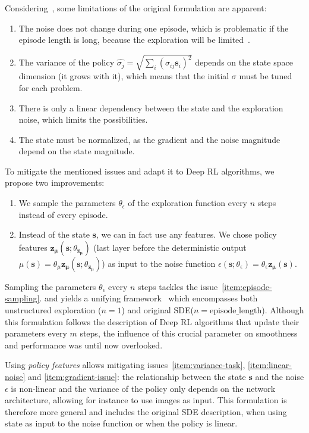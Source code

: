 \documentclass{article}
\newcommand{\state}{\mathbf{s}}
\newcommand{\pilatent}{\mathbf{z_\mu}}
\newcommand{\noise}{\epsilon}
\newcommand{\SDE}{\textsc{SDE}\xspace}
\begin{document}
Considering~, some limitations of the original formulation are apparent:
\begin{enumerate}[label=\roman*]
  \item The noise does not change during one episode, which is problematic if the episode length is long, because the exploration will be limited~\citep{hoof2017generalized}. \label{item:episode-sampling}
  \item The variance of the policy $\hat{\sigma_j} = \sqrt{\sum_i{(\sigma_{ij} \state_i)^2}}$ depends on the state space dimension (it grows with it), which means that the initial $\sigma$ must be tuned for each problem. \label{item:variance-task}
  \item There is only a linear dependency between the state and the exploration noise, which limits the possibilities. \label{item:linear-noise}
  \item The state must be normalized, as the gradient and the noise magnitude depend on the state magnitude. \label{item:gradient-issue}
\end{enumerate}

To mitigate the mentioned issues and adapt it to Deep RL algorithms, we propose two improvements:
\begin{enumerate}
  \item We sample the parameters $\theta_\noise$ of the exploration function every $n$ steps instead of every episode. \label{item:n-steps}
  \item Instead of the state $\state$, we can in fact use any features. We chose policy features $\pilatent(\state; \theta_\pilatent)$ (last layer before the deterministic output $\mu(\state) = \theta_\mu \pilatent(\state; \theta_\pilatent)$) as input to the noise function $\noise(\state; \theta_\noise) = \theta_\noise \pilatent(\state)$. \label{item:features}
\end{enumerate}

Sampling the parameters $\theta_\noise$ every $n$ steps tackles the issue~\ref{item:episode-sampling}. and yields a unifying framework~\citep{hoof2017generalized} which encompasses both unstructured exploration ($n=1$) and original \SDE ($n = \mathrm{episode\_length}$).
Although this formulation follows the description of Deep RL algorithms that update their parameters every $m$ steps, the influence of this crucial parameter on smoothness and performance was until now overlooked.


Using \textit{policy features} allows mitigating issues~\ref{item:variance-task}, \ref{item:linear-noise} and \ref{item:gradient-issue}: the relationship between the state $\state$ and the noise $\noise$ is non-linear and the variance of the policy only depends on the network architecture, allowing for instance to use images as input.
This formulation is therefore more general and includes the original \SDE description, when using state as input to the noise function or when the policy is linear.
\end{document}
